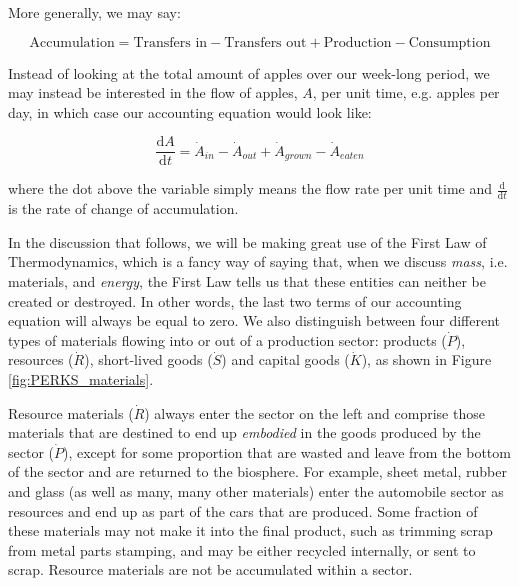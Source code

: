 \noindent More generally, we may say:

\begin{equation}
	\textrm{Accumulation}
	= \textrm{Transfers in} 
	- \textrm{Transfers out}
	+ \textrm{Production}
	- \textrm{Consumption}
\end{equation}

Instead of looking at the total amount of apples over our week-long period, we may 
instead be interested in the flow of apples, $A$, per unit time, e.g. apples per day, in
which case our accounting equation would look like:

\begin{equation}
	\frac{\mathrm{d}A}{\mathrm{d}t}
	= \dot{A}_{in}
	- \dot{A}_{out}
	+ \dot{A}_{grown}
	- \dot{A}_{eaten}
\end{equation}

\noindent where the dot above the variable simply means the flow rate per unit time and
 $\frac{\mathrm{d}}{\mathrm{d}t}$ is the rate of change of accumulation.

In the discussion that follows, we will be making great use of the First Law of 
Thermodynamics, which is a fancy way of saying that, when we discuss \emph{mass}, i.e.
materials, and \emph{energy}, the First Law tells us that these entities can neither be
created or destroyed. In other words, the last two terms of our accounting equation
will always be equal to zero. We also distinguish between four different types of
materials flowing into or out of a production sector: products ($\dot{P}$), resources ($\dot{R}$),
short-lived goods ($\dot{S}$) and capital goods ($\dot{K}$), as shown in Figure
\ref{fig:PERKS_materials}. 

Resource materials ($\dot{R}$) always enter the sector on the left and comprise those materials that
are destined to end up \emph{embodied} in the goods produced by the sector ($\dot{P}$), except
for some proportion that are wasted and leave from the bottom of the sector and are
returned to the biosphere. For example, sheet metal, rubber and glass (as well as
many, many other materials) enter the automobile sector as resources and end up as part
of the cars that are produced. Some fraction of these materials may not make it into the
final product, such as trimming scrap from metal parts stamping, and may be either
recycled internally, or sent to scrap. Resource materials are not be accumulated within
a sector.

